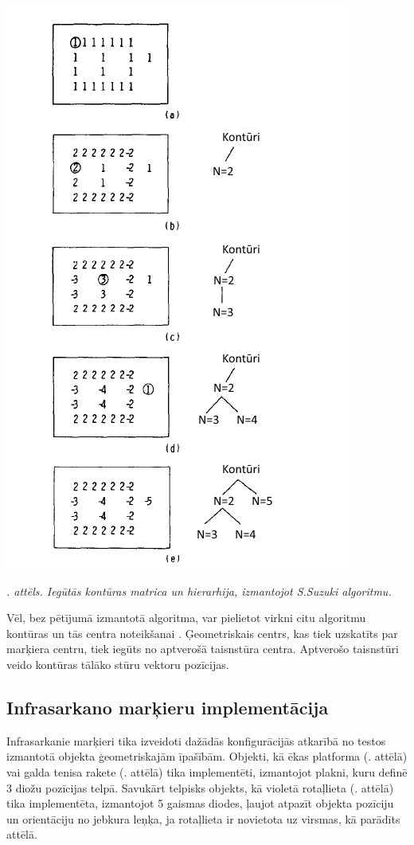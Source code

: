 \documentclass[12pt, a4paper, oneside, openright]{article}
\renewcommand{\thecimages}{\arabic{cimages}}
\begin{document}
\label{cimages:Suzuki1985_1}
\vspace{10pt}
\begin{samepage}
\begin{center}
\includegraphics[height=0.85\columnwidth]{images/Suzuki1985_1.png}
\begin{center}
\footnotesize{
\textit{\thecimages. attēls. Iegūtās kontūras matrica un hierarhija, izmantojot S.Suzuki algoritmu.}}
\end{center}
\end{center}
\end{samepage}

Vēl, bez pētījumā izmantotā algoritma, var pielietot virkni citu algoritmu kontūras un tās centra noteikšanai 
\cite{LingfeiZhang2008} \cite{KeshengWu2005} \cite{YuhaiLi2010} \cite{VictorM.A.Oliveira2010}.
Ģeometriskais centrs, kas tiek uzskatīts par marķiera centru, tiek iegūts no aptverošā taisnstūra centra.
Aptverošo taisnstūri veido kontūras tālāko stūru vektoru pozīcijas.


\newpage
\subsection{Infrasarkano marķieru implementācija}\label{section_implement}

\par 
Infrasarkanie marķieri tika izveidoti dažādās konfigurācijās atkarībā no testos izmantotā objekta
ģeometriskajām īpašībām. Objekti, kā ēkas platforma (. attēlā) vai galda tenisa
rakete (. attēlā) tika implementēti, izmantojot plakni, kuru definē 3 diožu pozīcijas
telpā. Savukārt telpisks objekts, kā violetā rotaļlieta (. attēlā) tika 
implementēta, izmantojot 5 gaismas diodes, ļaujot atpazīt objekta pozīciju un orientāciju no jebkura 
leņķa, ja rotaļlieta ir novietota uz virsmas, kā parādīts attēlā. 
\end{document}
